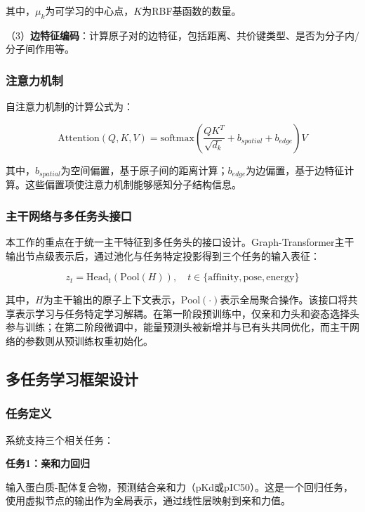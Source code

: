 其中，$\mu_k$为可学习的中心点，$K$为RBF基函数的数量。

（3）\textbf{边特征编码}：计算原子对的边特征，包括距离、共价键类型、是否为分子内/分子间作用等。

\subsubsection{注意力机制}

自注意力机制的计算公式为：

\begin{equation}
\text{Attention}(Q, K, V) = \text{softmax}\left(\frac{QK^T}{\sqrt{d_k}} + b_{spatial} + b_{edge}\right)V
\end{equation}

其中，$b_{spatial}$为空间偏置，基于原子间的距离计算；$b_{edge}$为边偏置，基于边特征计算。这些偏置项使注意力机制能够感知分子结构信息。

\subsubsection{主干网络与多任务头接口}

本工作的重点在于统一主干特征到多任务头的接口设计。Graph-Transformer主干输出节点级表示后，通过池化与任务特定投影得到三个任务的输入表征：

\begin{equation}
z_t = \text{Head}_t\left(\text{Pool}(H)\right), \quad t \in \{\text{affinity},\text{pose},\text{energy}\}
\end{equation}

其中，$H$为主干输出的原子上下文表示，$\text{Pool}(\cdot)$表示全局聚合操作。该接口将共享表示学习与任务特定学习解耦。在第一阶段预训练中，仅亲和力头和姿态选择头参与训练；在第二阶段微调中，能量预测头被新增并与已有头共同优化，而主干网络的参数则从预训练权重初始化。

\subsection{多任务学习框架设计}
\subsubsection{任务定义}

系统支持三个相关任务：

\textbf{任务1：亲和力回归}

输入蛋白质-配体复合物，预测结合亲和力（pKd或pIC50）。这是一个回归任务，使用虚拟节点的输出作为全局表示，通过线性层映射到亲和力值。

